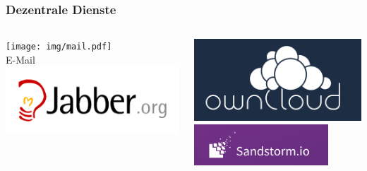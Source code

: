 \documentclass[12pt, xcolor={svgnames,table}]{beamer}
\begin{document}
\begin{frame}
  \frametitle{Dezentrale Dienste}
    \begin{columns}
        \begin{column}{5cm}
            \begin{center}
                \texttt{[image: img/mail.pdf]} \\
                E-Mail \\
                \vspace{1cm}
                \includegraphics[height=0.2\textheight]{img/jabber.png}
            \end{center}
        \end{column}
        \begin{column}{5cm}
            \begin{center}
                \includegraphics[height=0.2\textheight]{img/owncloud.png} \\
                \vspace{1cm}
                \includegraphics[width=0.8\textwidth]{img/sandstorm.png}
            \end{center}
        \end{column}
    \end{columns}
\end{frame}
\end{document}
